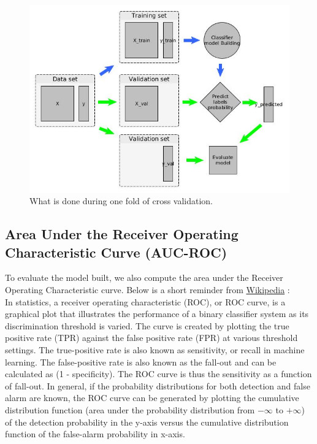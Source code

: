 	\begin{figure}[h]
		\centering
		\includegraphics[width=\textwidth]{images/cv_process.jpg}
		\caption{What is done during one fold of cross validation.}
		\label{fig:cv_process}
	\end{figure}

	\subsection{Area Under the Receiver Operating Characteristic Curve (AUC-ROC)}
		To evaluate the model built, we also compute the area under the Receiver Operating Characteristic curve.
		Below is a short reminder from \href{https://en.wikipedia.org/wiki/Receiver_operating_characteristic}{Wikipedia} :\\

		In statistics, a receiver operating characteristic (ROC), or ROC curve, is a graphical plot that illustrates the performance of a binary classifier system as its discrimination threshold is varied. The curve is created by plotting the true positive rate (TPR) against the false positive rate (FPR) at various threshold settings. The true-positive rate is also known as sensitivity, or recall in machine learning. The false-positive rate is also known as the fall-out and can be calculated as (1 - specificity). The ROC curve is thus the sensitivity as a function of fall-out. In general, if the probability distributions for both detection and false alarm are known, the ROC curve can be generated by plotting the cumulative distribution function (area under the probability distribution from $-\infty$ to $+\infty$) of the detection probability in the y-axis versus the cumulative distribution function of the false-alarm probability in x-axis.\\

